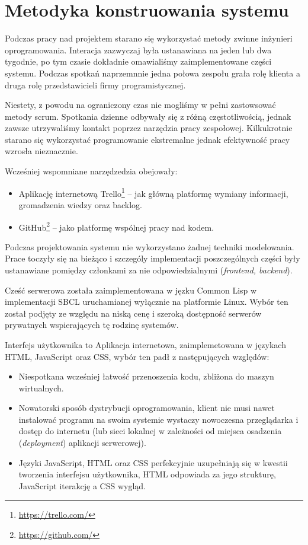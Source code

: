 \section{Metodyka konstruowania systemu}
Podczas pracy nad projektem starano się wykorzystać metody zwinne inżynieri oprogramowania. Interacja zazwyczaj była ustanawiana na jeden lub dwa tygodnie, po tym czasie dokładnie omawialiśmy zaimplementowane części systemu. Podczas spotkań naprzemnnie jedna połowa zespołu grała rolę klienta a druga rolę przedstawicieli firmy programistycznej.

Niestety, z powodu na ograniczony czas nie mogliśmy w pełni zastowsować metody scrum. Spotkania dzienne odbywały się z różną częstotliwością, jednak zawsze utrzywaliśmy kontakt poprzez narzędzia pracy zespołowej. Kilkukrotnie starano się wykorzystać programowanie ekstremalne jednak efektywność pracy wzrosła nieznacznie.

Wcześniej wspomniane narzędzedzia obejowały:
\begin{itemize}
  \item Aplikację internetową Trello\footnote{\url{https://trello.com/}} -- jak główną platformę wymiany informacji, gromadzenia wiedzy oraz backlog.
  \item GitHub\footnote{\url{https://github.com/}} -- jako platformę wspólnej pracy nad kodem.
  \end{itemize}

Podczas projektowania systemu nie wykorzystano żadnej techniki modelowania. Prace toczyły się na bieżąco i szczególy implementacji poszczególnych części były ustanawiane pomiędzy członkami za nie odpowiedzialnymi (\emph{frontend, backend}).

Cześć serwerowa została zaimplementowana w jęzku Common Lisp w implementacji SBCL uruchamianej wyłącznie na platformie Linux. Wybór ten został podjęty ze względu na niską cenę i szeroką dostępność serwerów prywatnych wspierających tę rodzinę systemów.

Interfejs użytkownika to Aplikacja internetowa, zaimplemetowana w językach HTML, JavaScript oraz CSS, wybór ten padł z następujących względów:
\begin{itemize}
  \item Niespotkana wcześniej łatwość przenoszenia kodu, zbliżona do maszyn wirtualnych.
  \item Nowatorski sposób dystrybucji oprogramowania, klient nie musi nawet instalować programu na swoim systemie wystaczy nowoczesna przeglądarka i dostęp do internetu (lub sieci lokalnej w zależności od miejsca osadzenia (\emph{deployment}) aplikacji serwerowej).
  \item Języki JavaScript, HTML oraz CSS perfekcyjnie uzupełniają się w kwestii tworzenia interfejsu użytkownika, HTML odpowiada za jego strukturę, JavaScript iterakcję a CSS wygląd.
\end{itemize}
